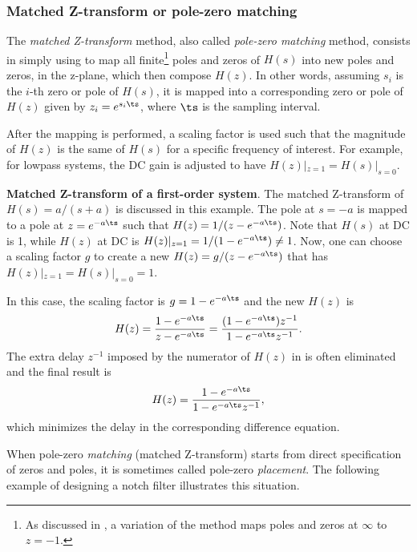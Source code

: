 \subsubsection{Matched Z-transform or pole-zero matching}

The \emph{matched Z-transform} method, also called \emph{pole-zero matching}
method, consists in simply using  to map all finite\footnote{As discussed in \cite{Hori92}, a variation of the method maps poles and zeros at $\infty$ to $z=-1$.} poles and zeros of $H(s)$ into new poles and zeros, in the z-plane, which then compose $H(z)$. In other words, assuming $s_i$ is the $i$-th zero or pole of $H(s)$, it is mapped into a corresponding zero or pole of $H(z)$ given by $z_i = e^{s_i \ts}$, where $\ts$ is the sampling interval.

After the mapping is performed, a scaling factor is
used such that the magnitude of $H(z)$ is the same of $H(s)$ for a specific frequency of
interest. For example, for lowpass systems, the DC gain is adjusted to have $H(z)|_{z=1} = H(s)|_{s=0}$.

\bExample \textbf{Matched Z-transform of a first-order system}.
The matched Z-transform of $H(s)=a/(s+a)$ is discussed in this example.
The pole at $s=-a$ is mapped to a pole at $z=e^{-a \ts}$ such that $H(z)=1/(z-e^{-a \ts})$. 
Note that $H(s)$ at DC is 1, while $H(z)$ at DC is $H(z)|_{z=1}=1/(1-e^{-a \ts}) \ne 1$.
Now, one can choose a scaling factor $g$ to create a new $H(z)=g/(z-e^{-a \ts})$
that has $H(z)|_{z=1}=H(s)|_{s=0}=1$.

In this case, the scaling factor is $g=1-e^{-a \ts}$ and the new $H(z)$ is
\begin{equation} 
H(z) = \frac{1-e^{-a \ts}}{z-e^{-a \ts}} = \frac{(1-e^{-a \ts})z^{-1}}{1-e^{-a \ts}z^{-1}}.
\label{eq:matchedZtransformExample}
\end{equation}
The extra delay $z^{-1}$ imposed by the numerator of $H(z)$ in  is 
often eliminated and the final result is
\begin{equation} 
H(z) = \frac{1-e^{-a \ts}}{1-e^{-a \ts}z^{-1}},
\label{eq:matchedZtransformExample2}
\end{equation}
which minimizes the delay in the corresponding difference equation.
\eExample

When pole-zero \emph{matching} (matched Z-transform) starts from direct specification of zeros and poles, it
is sometimes called pole-zero \emph{placement}. The following example of designing a notch
filter illustrates this situation.

